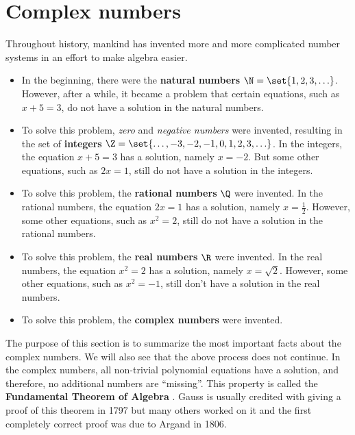 \appendix

\chapter{Complex numbers}

Throughout history, mankind has invented more and more complicated
number systems in an effort to make algebra easier.
\begin{itemize}
\item In the beginning, there were the \textbf{natural numbers}%
   $\N = \set{1, 2, 3, \ldots}$. However,
  after a while, it became a problem that certain equations, such as
  $x+5=3$, do not have a solution in the natural numbers.
\item To solve this problem, {\em zero} and {\em negative numbers}
  were invented, resulting in the set of \textbf{integers}%
   $\Z=\set{\ldots,-3,-2,-1,0,1,2,3,\ldots}$. In
  the integers, the equation $x+5=3$ has a solution, namely
  $x=-2$. But some other equations, such as $2x=1$, still do not have
  a solution in the integers.
\item To solve this problem, the \textbf{rational numbers}%
   $\Q$ were invented. In the rational
  numbers, the equation $2x=1$ has a solution, namely
  $x=\frac{1}{2}$. However, some other equations, such as $x^2=2$,
  still do not have a solution in the rational numbers.
\item To solve this problem, the \textbf{real numbers}%
   $\R$ were invented. In the real numbers,
  the equation $x^2=2$ has a solution, namely $x=\sqrt{2}$. However,
  some other equations, such as $x^2=-1$, still don't have a solution
  in the real numbers.
\item To solve this problem, the \textbf{complex numbers}%
   were invented.
\end{itemize}
The purpose of this section is to summarize the most important facts
about the complex numbers. We will also see that the above process
does not continue. In the complex numbers, all non-trivial polynomial
equations have a solution, and therefore, no additional numbers are
``missing''.  This property is called the \textbf{Fundamental Theorem
  of Algebra}%
%
. Gauss is usually credited with
giving a proof of this theorem in 1797 but many others worked on it
and the first completely correct proof was due to Argand in 1806.

